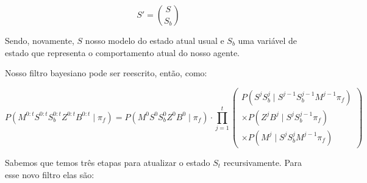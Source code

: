 \begin{equation}
	S' = \binom{S}{S_b}
\end{equation}

Sendo, novamente, $ S $ nosso modelo do estado atual usual e $ S_b $ uma variável de estado que representa o comportamento atual do nosso agente.

Nosso filtro bayesiano pode ser reescrito, então, como:

\begin{equation}
        P \left( M^{0: t} S^{0: t} S_b^{0: t} Z^{0: t} B^{0: t} \mid \pi_f \right) = P \left( M^0 S^0 S_b^0 Z^0 B^0 \mid \pi_f \right) \cdot \prod\limits_{j =1}^{t} 
        \left(
            \begin{array}{l}
                P \left( S^j S_b^j \mid S^{j -1} S_b^{j-1} M^{j -1} \pi_f \right) \\
                \times P \left( Z^j B^j \mid S^j S_b^{j-1} \pi_f \right) \\
                \times P \left( M^j \mid S^j S_b^j M^{j -1} \pi_f \right)
            \end{array}
        \right)
\end{equation}

Sabemos que temos três etapas para atualizar o estado $ S_t $ recursivamente. Para esse novo filtro elas são:

